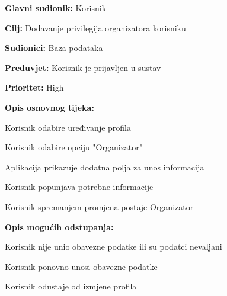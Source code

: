 \noindent {}
   	\begin{packed_item}
   		
   		\item \textbf{Glavni sudionik: }Korisnik
   		\item \textbf{Cilj:} Dodavanje privilegija organizatora korisniku
   		\item \textbf{Sudionici:} Baza podataka
   		\item \textbf{Preduvjet:} Korisnik je prijavljen u sustav
   		\item \textbf{Prioritet:} High
   		\item \textbf{Opis osnovnog tijeka:}
   		
   		\item[] \begin{packed_enum}
   			
   			\item Korisnik odabire uređivanje profila
   			\item Korisnik odabire opciju "Organizator"
   			\item Aplikacija prikazuje dodatna polja za unos informacija
   			\item Korisnik popunjava potrebne informacije
   			\item Korisnik spremanjem promjena postaje Organizator
   			
   		\end{packed_enum}
   		
   		\item  \textbf{Opis mogućih odstupanja:}
   		
   		\item[] \begin{packed_item}
   			
   			\item[5.a] Korisnik nije unio obavezne podatke ili su podatci nevaljani
   			\item[] \begin{packed_enum}
   				
   				\item Korisnik ponovno unosi obavezne podatke
   				\item Korisnik odustaje od izmjene profila
   				
   			\end{packed_enum}
   		\end{packed_item}
   	\end{packed_item}



